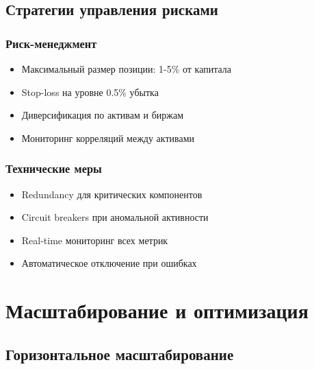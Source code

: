\documentclass[a4paper,11pt]{article}
\begin{document}
\subsection{Стратегии управления рисками}

\subsubsection{Риск-менеджмент}
\begin{itemize}
    \item Максимальный размер позиции: 1-5\% от капитала
    \item Stop-loss на уровне 0.5\% убытка
    \item Диверсификация по активам и биржам
    \item Мониторинг корреляций между активами
\end{itemize}

\subsubsection{Технические меры}
\begin{itemize}
    \item Redundancy для критических компонентов
    \item Circuit breakers при аномальной активности
    \item Real-time мониторинг всех метрик
    \item Автоматическое отключение при ошибках
\end{itemize}

\section{Масштабирование и оптимизация}

\subsection{Горизонтальное масштабирование}
\end{document}
